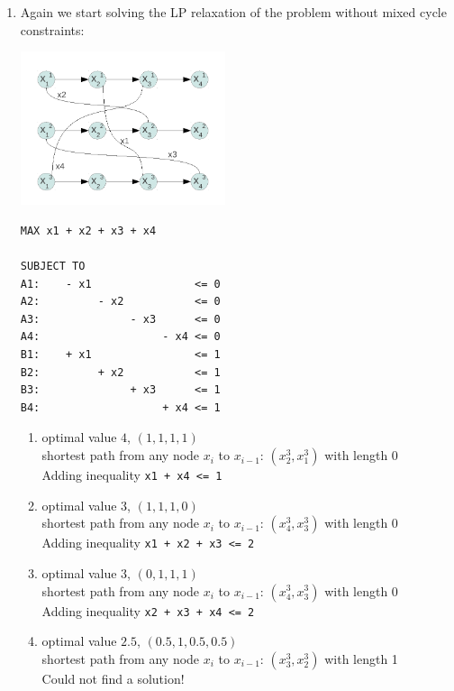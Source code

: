 \documentclass[a4paper, oneside]{scrartcl}
\begin{document}
\renewcommand{\labelenumi}{\alph{enumi})}
\begin{enumerate}
  \item Again we start solving the LP relaxation of the problem without mixed cycle constraints:
  
  \includegraphics[width=6cm]{ex9_align_graph_task3.pdf}
  
  \begin{verbatim}
MAX x1 + x2 + x3 + x4

SUBJECT TO
A1:    - x1                <= 0
A2:         - x2           <= 0
A3:              - x3      <= 0
A4:                   - x4 <= 0
B1:    + x1                <= 1
B2:         + x2           <= 1
B3:              + x3      <= 1
B4:                   + x4 <= 1
  \end{verbatim}
  \begin{enumerate}
    \item optimal value $4$, $(1,1,1,1)$ \\ 
          shortest path from any node $x_i$ to $x_{i-1}$: $(x_2^3, x_1^3)$ with length 0 \\
          Adding inequality \texttt{x1 + x4 <= 1}
    \item optimal value $3$, $(1,1,1,0)$ \\ 
          shortest path from any node $x_i$ to $x_{i-1}$: $(x_4^3, x_3^3)$ with length 0 \\
          Adding inequality \texttt{x1 + x2 + x3 <= 2}
    \item optimal value $3$, $(0,1,1,1)$ \\ 
          shortest path from any node $x_i$ to $x_{i-1}$: $(x_4^3, x_3^3)$ with length 0 \\
          Adding inequality \texttt{x2 + x3 + x4 <= 2}
    \item optimal value $2.5$, $(0.5,1,0.5,0.5)$ \\ 
          shortest path from any node $x_i$ to $x_{i-1}$: $(x_3^3, x_2^3)$ with length 1 \\
          Could not find a solution!
  \end{enumerate}
  

\end{enumerate}
\end{document}

